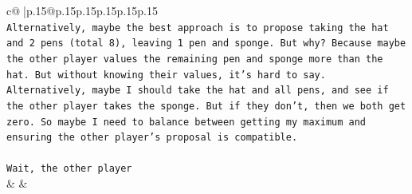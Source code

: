 \documentclass{article}
\begin{document}
{\begin{supertabular}{c@{$\;$}|p{.15\linewidth}@{}p{.15\linewidth}p{.15\linewidth}p{.15\linewidth}p{.15\linewidth}p{.15\linewidth}}
{{{\\ 
\texttt{Alternatively, maybe the best approach is to propose taking the hat and 2 pens (total 8), leaving 1 pen and sponge. But why? Because maybe the other player values the remaining pen and sponge more than the hat. But without knowing their values, it's hard to say. Alternatively, maybe I should take the hat and all pens, and see if the other player takes the sponge. But if they don't, then we both get zero. So maybe I need to balance between getting my maximum and ensuring the other player's proposal is compatible.} \\
\\ 
\texttt{Wait, the other player} \\
            }
        }
    }
    & & \\ \\


\end{supertabular}}
\end{document}
